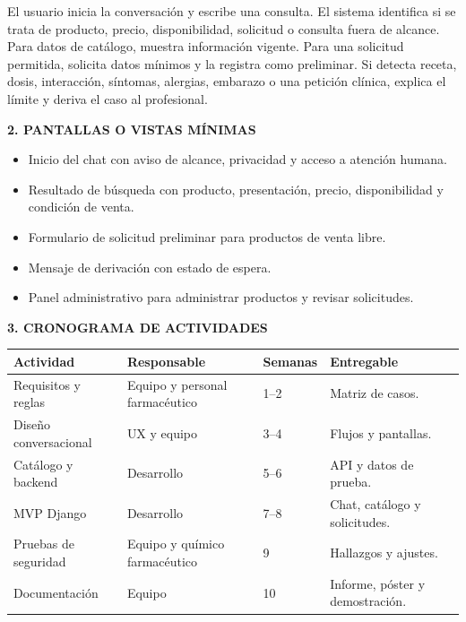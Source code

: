 \documentclass[11pt,a4paper]{article}
\newcommand{\apartado}[1]{\vspace{0.85em}\noindent\textbf{#1}\par\vspace{0.3em}}
\begin{document}
El usuario inicia la conversación y escribe una consulta. El sistema identifica si se trata de producto, precio, disponibilidad, solicitud o consulta fuera de alcance. Para datos de catálogo, muestra información vigente. Para una solicitud permitida, solicita datos mínimos y la registra como preliminar. Si detecta receta, dosis, interacción, síntomas, alergias, embarazo o una petición clínica, explica el límite y deriva el caso al profesional.

\apartado{2. PANTALLAS O VISTAS MÍNIMAS}

\begin{itemize}[leftmargin=1.5em,itemsep=0.3em]
    \item Inicio del chat con aviso de alcance, privacidad y acceso a atención humana.
    \item Resultado de búsqueda con producto, presentación, precio, disponibilidad y condición de venta.
    \item Formulario de solicitud preliminar para productos de venta libre.
    \item Mensaje de derivación con estado de espera.
    \item Panel administrativo para administrar productos y revisar solicitudes.
\end{itemize}

\apartado{3. CRONOGRAMA DE ACTIVIDADES}

\begin{table}[h!]
\centering
\small
\begin{tabularx}{\textwidth}{p{}p{}p{}Y}
\toprule
\textbf{Actividad} & \textbf{Responsable} & \textbf{Semanas} & \textbf{Entregable} \\
\midrule
Requisitos y reglas & Equipo y personal farmacéutico & 1--2 & Matriz de casos. \\
Diseño conversacional & UX y equipo & 3--4 & Flujos y pantallas. \\
Catálogo y backend & Desarrollo & 5--6 & API y datos de prueba. \\
MVP Django & Desarrollo & 7--8 & Chat, catálogo y solicitudes. \\
Pruebas de seguridad & Equipo y químico farmacéutico & 9 & Hallazgos y ajustes. \\
Documentación & Equipo & 10 & Informe, póster y demostración. \\
\bottomrule
\end{tabularx}
\end{table}
\end{document}
